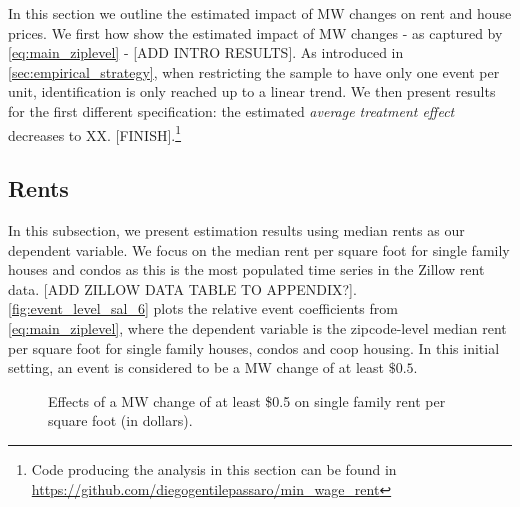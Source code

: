In this section we outline the estimated impact of MW changes on rent and house prices. We first how show the estimated impact of MW changes - as captured by \autoref{eq:main_ziplevel} - [ADD INTRO RESULTS]. As introduced in \autoref{sec:empirical_strategy}, when restricting the sample to have only one event per unit, identification is only reached up to a linear trend. We then present results for the first different specification: the estimated \textit{average treatment effect} decreases to XX. [FINISH].\footnote{Code producing the analysis in this section can be found in \url{https://github.com/diegogentilepassaro/min_wage_rent}} 

\subsection{Rents}\label{subsec:results/rents}
In this subsection, we present estimation results using median rents as our dependent variable. We focus on the median rent per square foot for single family houses and condos as this is the most populated time series in the Zillow rent data. [ADD ZILLOW DATA TABLE TO APPENDIX?]. \\   

\autoref{fig:event_level_sal_6} plots the relative event coefficients from \autoref{eq:main_ziplevel}, where the dependent variable is the zipcode-level median rent per square foot for single family houses, condos and coop housing. In this initial setting, an event is considered to be a MW change of at least $\$0.5$.  

\begin{figure}[h!]
    \centering
    \caption{Effects of a MW change of at least \$0.5 on single family rent per square foot (in dollars).}
    \label{fig:event_level_sal_6}
\end{figure}

